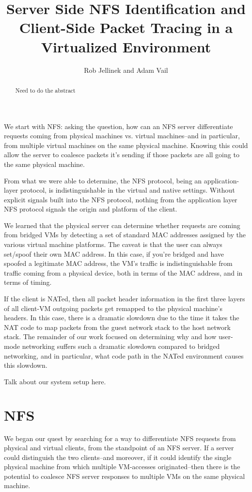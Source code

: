 \documentclass[11pt,pdftex,twocolumn]{article}
\title{Server Side NFS Identification and Client-Side Packet Tracing in a Virtualized Environment}
\author{Rob Jellinek and Adam Vail}
\begin{document}
\maketitle

\begin{abstract}
Need to do the abstract
\end{abstract}

We start with NFS: asking the question, how can an NFS server differentiate requests coming from physical machines vs. virtual machines--and in particular, from multiple virtual machines on the same physical machine. Knowing this could allow the server to coalesce packets it's sending if those packets are all going to the same physical machine. 

From what we were able to determine, the NFS protocol, being an application-layer protocol, is indistinguishable in the virtual and native settings. Without explicit signals built into the NFS protocol, nothing from the application layer NFS protocol signals the origin and platform of the client. 

We learned that the physical server can determine whether requests are coming from bridged VMs by detecting a set of standard MAC addresses assigned by the various virtual machine platforms. The caveat is that the user can always set/spoof their own MAC address. In this case, if you're bridged and have spoofed a legitimate MAC address, the VM's traffic is indistinguishable from traffic coming from a physical device, both in terms of the MAC address, and in terms of timing.

If the client is NATed, then all packet header information in the first three layers of all client-VM outgoing packets get remapped to the physical machine's headers. In this case, there is a dramatic slowdown due to the time it takes the NAT code to map packets from the guest network stack to the host network stack. The remainder of our work focused on determining why and how user-mode networking suffers such a dramatic slowdown compared to bridged networking, and in particular, what code path in the NATed environment causes this slowdown.


%


Talk about our system setup here. 

\section{NFS}
We began our quest by searching for a way to differentiate NFS requests from physical and virtual clients, from the standpoint of an NFS server. If a server could distinguish the two clients--and moreover, if it could identify the single physical machine from which multiple VM-accesses originated--then there is the potential to coalesce NFS server responses to multiple VMs on the same physical machine. 
\end{document}
